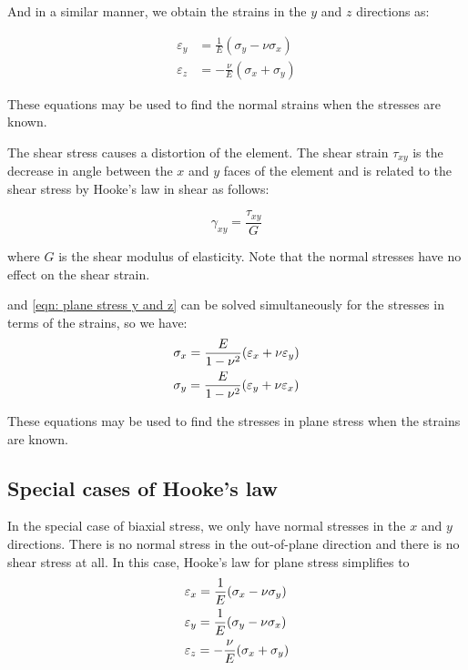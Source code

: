\documentclass[
10pt,
a4paper,
openany,
svgnames,
]{book} %
\begin{document}
And in a similar manner, we obtain the strains in the $y$ and $z$ directions as:

\begin{align} \label{eqn: plane stress y and z}
  \varepsilon_y &= \frac{1}{E}(\sigma_y - \nu \sigma_x) \nonumber \\
  \varepsilon_z &=  - \frac{\nu }{E}(\sigma_x + \sigma_y)
\end{align}

These equations may be used to find the normal strains when the stresses are known.

The shear stress causes a distortion of the element. The shear strain $\tau_{xy}$ is the decrease in angle between the $x$ and $y$ faces of the element and is related to the shear stress by Hooke’s law in shear as follows:

\begin{equation}
  \gamma_{xy} = \frac{\tau_{xy}}{G}
\end{equation}

where $G$ is the shear modulus of elasticity. Note that the normal stresses have no effect on the shear strain.

 and \cref{eqn: plane stress y and z} can be solved simultaneously for the stresses in terms of the strains, so we have:
\begin{equation}
  \begin{gathered}
    \sigma_x = \frac{E}{1 - \nu^2}(\varepsilon_x + \nu \varepsilon_y) \hfill \\
    \sigma_y = \frac{E}{1 - \nu^2}(\varepsilon_y + \nu \varepsilon_x) \hfill \\ 
  \end{gathered}
\end{equation}

These equations may be used to find the stresses in plane stress when the strains are known.

\subsection{Special cases of Hooke’s law}

In the special case of biaxial stress, we only have normal stresses in the $x$ and $y$ directions. There is no normal stress in the out-of-plane direction and there is no shear stress at all. In this case, Hooke’s law for plane stress simplifies to
\begin{equation}
  \begin{gathered}
    \varepsilon_x = \frac{1}{E}(\sigma_x - \nu \sigma_y) \hfill \\
    \varepsilon_y = \frac{1}{E}(\sigma_y - \nu \sigma_x) \hfill \\
    \varepsilon_z =  - \frac{\nu }{E}(\sigma_x + \sigma_y) \hfill \\ 
  \end{gathered}
\end{equation}
\end{document}
